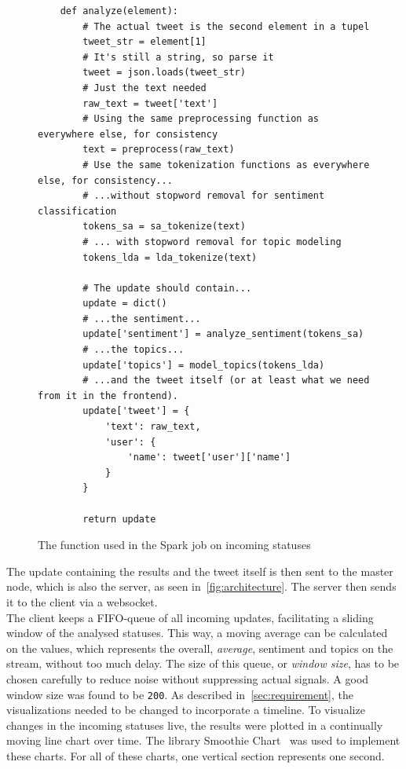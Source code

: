 \begin{figure}
    \caption{The function used in the Spark job on incoming statuses}
    \label{fig:spark_job}
    \begin{verbatim}
    def analyze(element):
        # The actual tweet is the second element in a tupel
        tweet_str = element[1]
        # It's still a string, so parse it
        tweet = json.loads(tweet_str)
        # Just the text needed
        raw_text = tweet['text']
        # Using the same preprocessing function as everywhere else, for consistency
        text = preprocess(raw_text)
        # Use the same tokenization functions as everywhere else, for consistency...
        # ...without stopword removal for sentiment classification
        tokens_sa = sa_tokenize(text)
        # ... with stopword removal for topic modeling
        tokens_lda = lda_tokenize(text)

        # The update should contain...
        update = dict()
        # ...the sentiment...
        update['sentiment'] = analyze_sentiment(tokens_sa)
        # ...the topics...
        update['topics'] = model_topics(tokens_lda)
        # ...and the tweet itself (or at least what we need from it in the frontend).
        update['tweet'] = {
            'text': raw_text,
            'user': {
                'name': tweet['user']['name']
            }
        }

        return update
    \end{verbatim}
\end{figure}

The update containing the results and the tweet itself is then sent to the master node,
which is also the server, as seen in~\autoref{fig:architecture}.
The server then sends it to the client via a websocket.
\\%
The client keeps a FIFO-queue of all incoming updates, facilitating a sliding window of the analysed statuses.
This way, a moving average can be calculated on the values, which represents the overall, \textit{average},
sentiment and topics on the stream, without too much delay.
The size of this queue, or \textit{window size}, has to be chosen carefully to reduce noise without suppressing actual signals.
A good window size was found to be \texttt{200}.
As described in~\autoref{sec:requirement}, the visualizations needed to be changed to incorporate a timeline.
To visualize changes in the incoming statuses live, the results were plotted in a continually moving line chart over time.
The library Smoothie Chart~\cite{smoothieDocs} was used to implement these charts.
For all of these charts, one vertical section represents one second.

